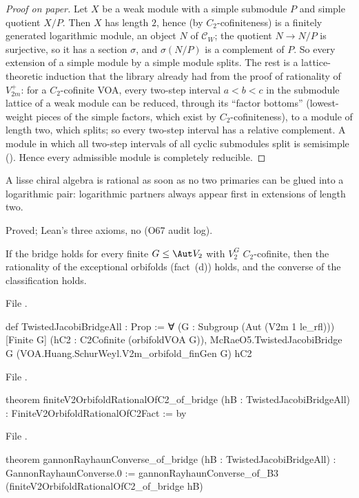\begin{proof}[Proof on paper]
Let $X$ be a weak module with a simple submodule $P$ and simple quotient $X/P$. Then $X$ has length $2$, hence (by
$C_2$-cofiniteness) is a finitely generated logarithmic module, an object $N$ of $\mathcal C_W$; the quotient
$N\to N/P$ is surjective, so it has a section $\sigma$, and $\sigma(N/P)$ is a complement of $P$. So every extension of a
simple module by a simple module splits. The rest is a lattice-theoretic induction that the library already had
from the proof of rationality of $V_{2m}^+$: for a $C_2$-cofinite VOA, every two-step interval $a<b<c$ in the submodule
lattice of a weak module can be reduced, through its ``factor bottoms'' (lowest-weight pieces of the simple factors,
which exist by $C_2$-cofiniteness), to a module of length two, which splits; so every two-step interval has a relative
complement. A module in which all two-step intervals of all cyclic submodules split is semisimple
(). Hence every admissible module is completely reducible.
\end{proof}

\begin{physics}
A lisse chiral algebra is rational as soon as no two primaries can be glued into a logarithmic pair: logarithmic
partners always appear first in extensions of length two.
\end{physics}

\begin{status}
Proved; Lean's three axioms, no  (O67 audit log).
\end{status}

\begin{theorem}\label{l22:thm:O7V2}
If the bridge holds for every finite $G\le\Aut V_2$ with $V_2^G$ $C_2$-cofinite, then the rationality of the exceptional orbifolds (fact~(d)) holds, and the converse of the
classification holds.
\end{theorem}
\noindent File .
\begin{leancode}
def TwistedJacobiBridgeAll : Prop :=
  ∀ (G : Subgroup (Aut (V2m 1 le_rfl))) [Finite G] (hC2 : C2Cofinite (orbifoldVOA G)),
    McRaeO5.TwistedJacobiBridge G (VOA.Huang.SchurWeyl.V2m_orbifold_finGen G) hC2
\end{leancode}
\noindent File .
\begin{leancode}
theorem finiteV2OrbifoldRationalOfC2_of_bridge (hB : TwistedJacobiBridgeAll) :
    FiniteV2OrbifoldRationalOfC2Fact := by
\end{leancode}
\noindent File .
\begin{leancode}
theorem gannonRayhaunConverse_of_bridge (hB : TwistedJacobiBridgeAll) :
    GannonRayhaunConverse.{0} :=
  gannonRayhaunConverse_of_B3 (finiteV2OrbifoldRationalOfC2_of_bridge hB)
\end{leancode}

